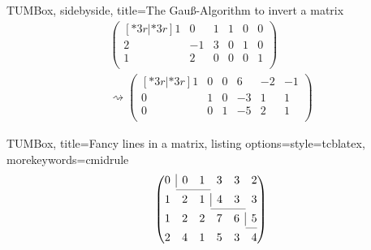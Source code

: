 \documentclass[DIV=13]{scrartcl}
\begin{document}
\begin{tcblisting}{TUMBox, sidebyside,
    title=The Gauß-Algorithm to invert a matrix}
  \begin{gather}
    \begin{pmatrix}[*3r|*3r]
      1 & 0  & 1 & 1 & 0 & 0 \\
      2 & -1 & 3 & 0 & 1 & 0 \\
      1 & 2  & 0 & 0 & 0 & 1 \\
    \end{pmatrix}\\[2ex]
    \rightsquigarrow
    \begin{pmatrix}[*3r|*3r]
      1 & 0 & 0 & 6  & -2 & -1 \\
      0 & 1 & 0 & -3 & 1  & 1  \\
      0 & 0 & 1 & -5 & 2  & 1  \\
    \end{pmatrix}
  \end{gather}
\end{tcblisting}
\begin{tcblisting}{TUMBox, title=Fancy lines in a matrix,
    listing options={style=tcblatex, morekeywords={cmidrule}}
  }
  \begin{equation}
    \begin{pmatrix}
      0 & \multicolumn{1}{|c}{0} & 1 & 3 & 3 & 2 \\
      \cmidrule{2-3}
      1 & 2 & 1 & \multicolumn{1}{|c}{4} & 3 & 3 \\
      \cmidrule{4-5}
      1 & 2 & 2 & 7 & \multicolumn{1}{c|}{6} & 5 \\
      \cmidrule(r){6-6}
      2 & 4 & 1 & 5 & 3 & 4 \\
    \end{pmatrix}
  \end{equation}
\end{tcblisting}
\end{document}
